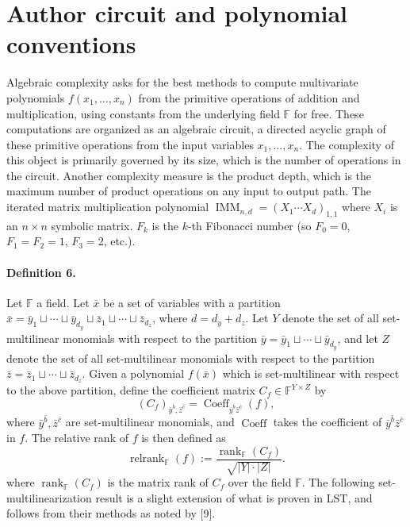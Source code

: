 \section*{Author circuit and polynomial conventions}
Algebraic complexity asks for the best methods to compute multivariate polynomials $f(x_1,\ldots,x_n)$ from the primitive operations of addition and multiplication, using constants from the underlying field $\mathbb F$ for free. These computations are organized as an algebraic circuit, a directed acyclic graph of these primitive operations from the input variables $x_1,\ldots,x_n$. The complexity of this object is primarily governed by its size, which is the number of operations in the circuit. Another complexity measure is the product depth, which is the maximum number of product operations on any input to output path.
The iterated matrix multiplication polynomial $\operatorname{IMM}_{n,d}=(X_1\cdots X_d)_{1,1}$ where $X_i$ is an $n\times n$ symbolic matrix. $F_k$ is the $k$-th Fibonacci number (so $F_0=0$, $F_1=F_2=1$, $F_3=2$, etc.).
\paragraph{Definition 6.} Let $\mathbb F$ a field. Let $\bar x$ be a set of variables with a partition $\bar x=\bar y_1\sqcup\cdots\sqcup\bar y_{d_y}\sqcup\bar z_1\sqcup\cdots\sqcup\bar z_{d_z}$, where $d=d_y+d_z$. Let $Y$ denote the set of all set-multilinear monomials with respect to the partition $\bar y=\bar y_1\sqcup\cdots\sqcup\bar y_{d_y}$, and let $Z$ denote the set of all set-multilinear monomials with respect to the partition $\bar z=\bar z_1\sqcup\cdots\sqcup\bar z_{d_z}$.
Given a polynomial $f(\bar x)$ which is set-multilinear with respect to the above partition, define the coefficient matrix $C_f\in\mathbb F^{Y\times Z}$ by
\[(C_f)_{\bar y^{\bar b},\bar z^{\bar c}}=\operatorname{Coeff}_{\bar y^{\bar b}\bar z^{\bar c}}(f),\]
where $\bar y^{\bar b},\bar z^{\bar c}$ are set-multilinear monomials, and $\operatorname{Coeff}$ takes the coefficient of $\bar y^{\bar b}\bar z^{\bar c}$ in $f$.
The relative rank of $f$ is then defined as
\[\operatorname{relrank}_{\mathbb F}(f):=\frac{\operatorname{rank}_{\mathbb F}(C_f)}{\sqrt{|Y|\cdot|Z|}}.\]
where $\operatorname{rank}_{\mathbb F}(C_f)$ is the matrix rank of $C_f$ over the field $\mathbb F$.
The following set-multilinearization result is a slight extension of what is proven in LST, and follows from their methods as noted by [9].
